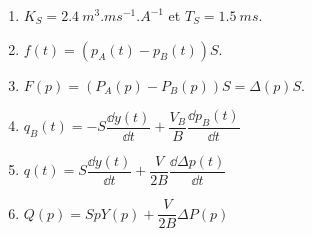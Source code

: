 \begin{enumerate}
\item $K_S = \SI{2,4}{m^3.ms^{-1}.A^{-1}}$ et $T_S = \SI{1,5}{ms}$.
\item $f(t)=\left(p_A(t)-p_B(t)\right)S$.
\item $F(p)=\left(P_A(p)-P_B(p)\right)S=\Delta (p)S$.
\item $q_B(t)=-S\dfrac{\dd y(t)}{\dd t}+\dfrac{V_B}{B}\dfrac{\dd p_B(t)}{\dd t}$
\item $q(t)=S\dfrac{\dd y(t)}{\dd t}+\dfrac{V}{2B}\dfrac{\dd \Delta p(t)}{\dd t}$
\item $Q(p)=SpY(p)+\dfrac{V}{2B}\Delta P (p)$
\end{enumerate}

